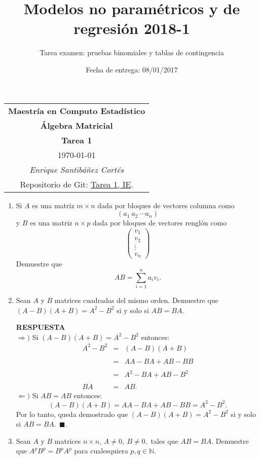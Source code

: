 \documentclass[11pt,letterpaper]{article}
\title{Modelos no paramétricos y de regresión 2018-1}
\author{Tarea examen: pruebas binomiales y tablas de contingencia}
\date{Fecha de entrega: 08/01/2017}
\newcommand{\res}{\textbf{RESPUESTA}\\}
\newcommand{\finf}{\blacksquare.}
\begin{document}
\begin{table}[ht]
\centering
\begin{tabular}{c}
\textbf{Maestría en Computo Estadístico}\\
\textbf{Álgebra Matricial} \\
\textbf{Tarea 1}\\
\today \\
\emph{Enrique Santibáñez Cortés}\\
Repositorio de Git: \href{https://github.com/Enriquesec/Inferencia_Estad-stica/tree/master/Tareas/Tarea_1}{Tarea 1, IE}.
\end{tabular}
\end{table}

\begin{enumerate}
\item Si $A$ es una matriz $m\times n$ dada por bloques de vectores columna como $$ (a_1\ a_2\ \cdots a_n)$$ y $B$ es una matriz $n\times p$ dada por bloques de vectores renglón como
\begin{equation*}
\left(\begin{array}{c}
v_1\\
v_2\\
\vdots \\
v_n
\end{array}
\right)
\end{equation*}
Demuestre que $$AB=\sum_{i=1}^na_iv_i.$$

\item Sean $A$ y $B$ matrices cuadradas del mismo orden. Demuestre que $(A-B)(A+B)=A^2-B^2$ si y solo si $AB=BA.$

\res
$\Rightarrow)$ Si $(A-B)(A+B)=A^2-B^2$ entonces:
\begin{equation*}
\begin{array}{ccc}
A^2-B^2&=&(A-B)(A+B)\\
&&\\
&=&AA-BA+AB-BB\\
&&\\
&=&A^2-BA+AB-B^2 \\
&&\\
BA&=&AB.
\end{array}
\end{equation*}
$\Leftarrow)$ Si $AB=AB$ entonces:
$$(A-B)(A+B)=AA-BA+AB-BB=A^2-B^2.$$
Por lo tanto, queda demostrado que $(A-B)(A+B)=A^2-B^2$ si y solo si $AB=BA.\ \ \finf$

\item Sean $A$ y $B$ matrices $n\times n$, $A\neq 0, \ B\neq 0,$ tales que $AB=BA.$ Demuestre que $A^pB^p=B^pA^p$ para cualesquiera $p,q\in \mathbb{N}.$


\end{enumerate}
\end{document}
